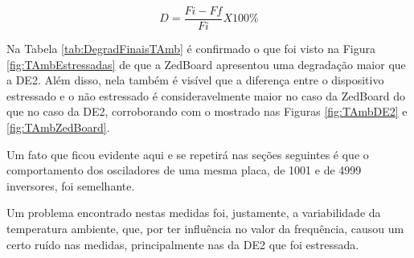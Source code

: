 



\begin{equation}
    \label{eq:DegradacaoPorcent}
    D = \frac{F{\scriptstyle i} - F{\scriptstyle f}}{F{\scriptstyle i}} X 100\%
\end{equation}

Na Tabela \ref{tab:DegradFinaisTAmb} é confirmado o que foi visto na Figura \ref{fig:TAmbEstressadas} de que a ZedBoard apresentou uma degradação maior que a DE2. Além disso, nela também é visível que a diferença entre o dispositivo estressado e o não estressado é consideravelmente maior no caso da ZedBoard do que no caso da DE2, corroborando com o mostrado nas Figuras \ref{fig:TAmbDE2} e \ref{fig:TAmbZedBoard}.

Um fato que ficou evidente aqui e se repetirá nas seções seguintes é que o comportamento dos osciladores de uma mesma placa, de 1001 e de 4999 inversores, foi semelhante.

Um problema encontrado nestas medidas foi, justamente, a variabilidade da temperatura ambiente, que, por ter influência no valor da frequência, causou um certo ruído nas medidas, principalmente nas da DE2 que foi estressada.